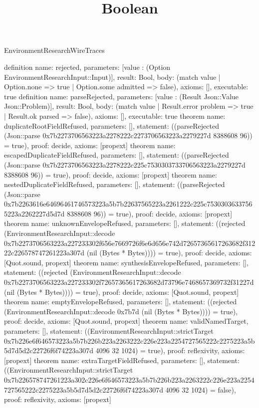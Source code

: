 \begin{lexlean}{EnvironmentResearchWireTraces}
\title{Boolean}
\begin{semanticmodule}
definition{
 name: rejected, parameters: [value : (Option EnvironmentResearchInput::Input)], result: Bool,
 body: (match value | Option.none => true | Option.some admitted => false),
 axioms: [], executable: true
}
definition{
 name: parseRejected, parameters: [value : (Result Json::Value Json::Problem)], result: Bool,
 body: (match value | Result.error problem => true | Result.ok parsed => false),
 axioms: [], executable: true
}
theorem{
 name: duplicateRootFieldRefused, parameters: [],
 statement: ((parseRejected (Json::parse 0x7b2273706563223a2278222c2273706563223a2279227d 8388608 96)) = true), proof: decide{}, axioms: [propext]
}
theorem{
 name: escapedDuplicateFieldRefused, parameters: [],
 statement: ((parseRejected (Json::parse 0x7b2273706563223a2278222c225c7530303733706563223a2279227d 8388608 96)) = true), proof: decide{}, axioms: [propext]
}
theorem{
 name: nestedDuplicateFieldRefused, parameters: [],
 statement: ((parseRejected (Json::parse 0x7b2263616e64696461746573223a5b7b22637565223a2261222c225c75303036337565223a2262227d5d7d 8388608 96)) = true), proof: decide{}, axioms: [propext]
}
theorem{
 name: unknownEnvelopeRefused, parameters: [],
 statement: ((rejected (EnvironmentResearchInput::decode 0x7b2273706563223a227233302f656e7669726f6e6d656e742d72657365617263682f31222c226578747261223a307d (nil (Bytes * Bytes)))) = true), proof: decide{}, axioms: [Quot.sound, propext]
}
theorem{
 name: synthesisEnvelopeRefused, parameters: [],
 statement: ((rejected (EnvironmentResearchInput::decode 0x7b2273706563223a227233302f72657365617263682d73796e7468657369732f31227d (nil (Bytes * Bytes)))) = true), proof: decide{}, axioms: [Quot.sound, propext]
}
theorem{
 name: emptyEnvelopeRefused, parameters: [],
 statement: ((rejected (EnvironmentResearchInput::decode 0x7b7d (nil (Bytes * Bytes)))) = true), proof: decide{}, axioms: [Quot.sound, propext]
}
theorem{
 name: validNamedTarget, parameters: [],
 statement: ((EnvironmentResearchInput::strictTarget 0x7b226e6f646573223a5b7b226b223a2263222c226e223a2254727565222c2275223a5b5d7d5d2c22726f6f74223a307d 4096 32 1024) = true), proof: reflexivity{}, axioms: [propext]
}
theorem{
 name: extraTargetFieldRefused, parameters: [],
 statement: ((EnvironmentResearchInput::strictTarget 0x7b226578747261223a302c226e6f646573223a5b7b226b223a2263222c226e223a2254727565222c2275223a5b5d7d5d2c22726f6f74223a307d 4096 32 1024) = false), proof: reflexivity{}, axioms: [propext]
}
\end{semanticmodule}
\end{lexlean}
